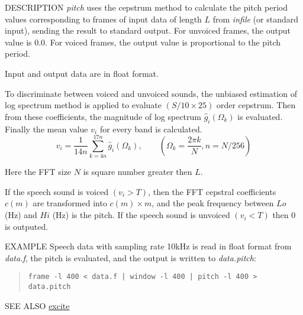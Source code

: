 \begin{qsection}{DESCRIPTION}
{\em pitch} uses the cepstrum method to calculate the pitch period values
corresponding to frames of input data of length $L$ 
from {\em infile} (or standard input), 
sending the result to standard output. 
For unvoiced frames, the output value is 0.0. 
For voiced frames, the output value is proportional to the pitch period.

Input and output data are in float format.

To discriminate between voiced and unvoiced sounds,
the unbiased estimation of log spectrum method is applied
to evaluate $(S/10 \times 25)$ order cepstrum.
Then from these coefficients, the magnitude of log spectrum
$\hat{g}_i(\Omega_k)$ is evaluated.
Finally the mean value $v_i$ for every band is calculated.
\begin{displaymath}
v_i = \frac{1}{14 n}\sum_{k = 4 n}^{17 n}\hat{g}_i(\Omega_k),\qquad (\Omega_k = \frac{2 \pi k}{N},n = N /256)
\end{displaymath}

Here the FFT size $N$ is square number greater then $L$.

If the speech sound is voiced $(v_i > T)$,
then the FFT cepstral coefficients $c(m)$ are transformed
into $c(m) \times m$,
and the peak frequency between $Lo$ (Hz) and $Hi$ (Hz)
is the pitch.
If the speech sound is unvoiced $(v_i < T)$
then $0$ is outputed.

\end{qsection}

\begin{options}
\end{options}

\begin{qsection}{EXAMPLE}
Speech data with sampling rate 10kHz is read in float format
from {\em data.f}, the pitch is evaluated, and
the output is written to {\em data.pitch}:
\begin{quote}
  \verb!frame -l 400 < data.f | window -l 400 | pitch -l 400 > data.pitch !
\end{quote}
\end{qsection}

\begin{qsection}{SEE ALSO}
\hyperlink{excite}{excite}
\end{qsection}
